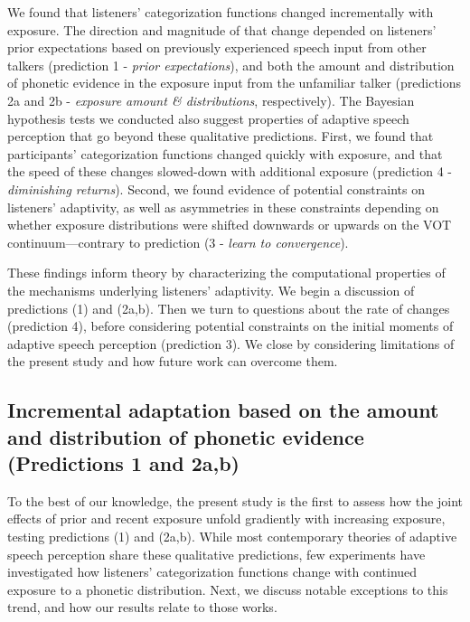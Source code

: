 \documentclass[
  11pt,
  man,mask,floatsintext]{apa6}
\begin{document}
We found that listeners' categorization functions changed incrementally with exposure. The direction and magnitude of that change depended on listeners' prior expectations based on previously experienced speech input from other talkers (prediction 1 - \emph{prior expectations}), and both the amount and distribution of phonetic evidence in the exposure input from the unfamiliar talker (predictions 2a and 2b - \emph{exposure amount \& distributions}, respectively). The Bayesian hypothesis tests we conducted also suggest properties of adaptive speech perception that go beyond these qualitative predictions. First, we found that participants' categorization functions changed quickly with exposure, and that the speed of these changes slowed-down with additional exposure (prediction 4 - \emph{diminishing returns}). Second, we found evidence of potential constraints on listeners' adaptivity, as well as asymmetries in these constraints depending on whether exposure distributions were shifted downwards or upwards on the VOT continuum---contrary to prediction (3 - \emph{learn to convergence}).

These findings inform theory by characterizing the computational properties of the mechanisms underlying listeners' adaptivity. We begin a discussion of predictions (1) and (2a,b). Then we turn to questions about the rate of changes (prediction 4), before considering potential constraints on the initial moments of adaptive speech perception (prediction 3). We close by considering limitations of the present study and how future work can overcome them.

\subsection{Incremental adaptation based on the amount and distribution of phonetic evidence (Predictions 1 and 2a,b)}\label{incremental-adaptation-based-on-the-amount-and-distribution-of-phonetic-evidence-predictions-1-and-2ab}

To the best of our knowledge, the present study is the first to assess how the joint effects of prior and recent exposure unfold gradiently with increasing exposure, testing predictions (1) and (2a,b). While most contemporary theories of adaptive speech perception share these qualitative predictions, few experiments have investigated how listeners' categorization functions change with continued exposure to a phonetic distribution. Next, we discuss notable exceptions to this trend, and how our results relate to those works.
\end{document}
